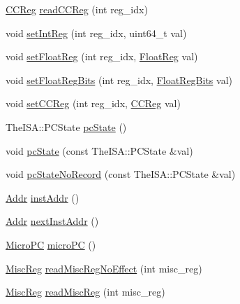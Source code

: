 \begin{DoxyCompactItemize}
\item 
\hyperlink{classThreadContext_a0c9de550a32808e6a25b54b6c791d5ab}{CCReg} \hyperlink{classCheckerThreadContext_ac3d147c535052bfb1f8e8fe0697168d7}{readCCReg} (int reg\_\-idx)
\item 
void \hyperlink{classCheckerThreadContext_abc264e8ee37c6bd7d7b5759b97c34356}{setIntReg} (int reg\_\-idx, uint64\_\-t val)
\item 
void \hyperlink{classCheckerThreadContext_ab6fd8e55b81c173f448ec0c42bc28b99}{setFloatReg} (int reg\_\-idx, \hyperlink{classThreadContext_a75484259f1855aabc8d74c6eb1cfe186}{FloatReg} val)
\item 
void \hyperlink{classCheckerThreadContext_a618651078f08ecd328dfe3312f0f2ea7}{setFloatRegBits} (int reg\_\-idx, \hyperlink{classThreadContext_aab5eeae86499f9bfe15ef79360eccc64}{FloatRegBits} val)
\item 
void \hyperlink{classCheckerThreadContext_afd6c42b1888ad21a4382078ca7a86d09}{setCCReg} (int reg\_\-idx, \hyperlink{classThreadContext_a0c9de550a32808e6a25b54b6c791d5ab}{CCReg} val)
\item 
TheISA::PCState \hyperlink{classCheckerThreadContext_a827fb3454585cf4c620f4fd341966317}{pcState} ()
\item 
void \hyperlink{classCheckerThreadContext_a5e9cfc754c9ef9b7db875ce89871944e}{pcState} (const TheISA::PCState \&val)
\item 
void \hyperlink{classCheckerThreadContext_a6005386aeeaecb35499c3199fb47ba2f}{pcStateNoRecord} (const TheISA::PCState \&val)
\item 
\hyperlink{base_2types_8hh_af1bb03d6a4ee096394a6749f0a169232}{Addr} \hyperlink{classCheckerThreadContext_a53c92716db281ae16ffb693c6d7803c7}{instAddr} ()
\item 
\hyperlink{base_2types_8hh_af1bb03d6a4ee096394a6749f0a169232}{Addr} \hyperlink{classCheckerThreadContext_aceec6e28772f91b3cc921c0e3927b0c2}{nextInstAddr} ()
\item 
\hyperlink{base_2types_8hh_adfb4d8b20c5abc8be73dd367b16f2d57}{MicroPC} \hyperlink{classCheckerThreadContext_a1a21696f33a7d38f251687ae0b5e9718}{microPC} ()
\item 
\hyperlink{classThreadContext_aaf5f073a387db0556d1db4bcc45428bc}{MiscReg} \hyperlink{classCheckerThreadContext_a7b5ac6af9c2c19d7c1b442b8a3aebbc6}{readMiscRegNoEffect} (int misc\_\-reg)
\item 
\hyperlink{classThreadContext_aaf5f073a387db0556d1db4bcc45428bc}{MiscReg} \hyperlink{classCheckerThreadContext_a5a8c6c487e8da143d26188258b04f1cc}{readMiscReg} (int misc\_\-reg)

\end{DoxyCompactItemize}
